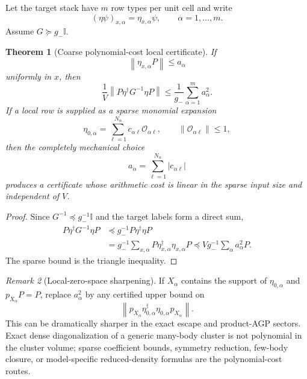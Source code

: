 \documentclass[11pt]{article}
\newtheorem{theorem}{Theorem}[section]
\theoremstyle{definition}
\theoremstyle{remark}
\newtheorem{remark}[theorem]{Remark}
\newcommand{\Id}{\mathbb I}
\newcommand{\cO}{\mathcal O}
\newcommand{\norm}[1]{\left\lVert #1\right\rVert}
\newcommand{\abs}[1]{\left\lvert #1\right\rvert}
\begin{document}
Let the target stack have $m$ row types per unit cell and write
\begin{equation}
 (\eta\psi)_{x,\alpha}=\eta_{x,\alpha}\psi,
 \qquad \alpha=1,\ldots,m.
 \label{eq:etacomponents}
\end{equation}
Assume $G\succeq g_-\Id$.

\begin{theorem}[Coarse polynomial-cost local certificate]
\label{thm:sparserow}
If
\begin{equation}
 \norm{\eta_{x,\alpha}P}\le a_\alpha
 \label{eq:arow}
\end{equation}
uniformly in $x$, then
\begin{equation}
 \boxed{
 \frac1V\norm{P\eta^\dagger G^{-1}\eta P}
 \le\frac1{g_-}\sum_{\alpha=1}^{m}a_\alpha^2.}
 \label{eq:sparserowbound}
\end{equation}
If a local row is supplied as a sparse monomial expansion
\begin{equation}
 \eta_{0,\alpha}=\sum_{\ell=1}^{N_\alpha}c_{\alpha\ell}\cO_{\alpha\ell},
 \qquad \norm{\cO_{\alpha\ell}}\le1,
 \label{eq:monomialeta}
\end{equation}
then the completely mechanical choice
\begin{equation}
 a_\alpha=\sum_{\ell=1}^{N_\alpha}\abs{c_{\alpha\ell}}
 \label{eq:l1row}
\end{equation}
produces a certificate whose arithmetic cost is linear in the sparse input size and independent of $V$.
\end{theorem}

\begin{proof}
Since $G^{-1}\preceq g_-^{-1}\Id$ and the target labels form a direct sum,
\begin{align}
 P\eta^\dagger G^{-1}\eta P
 &\preceq g_-^{-1}P\eta^\dagger\eta P\\
 &=g_-^{-1}\sum_{x,\alpha}P\eta_{x,\alpha}^\dagger\eta_{x,\alpha}P
 \preceq Vg_-^{-1}\sum_\alpha a_\alpha^2P.
\end{align}
The sparse bound is the triangle inequality.
\end{proof}

\begin{remark}[Local-zero-space sharpening]
If $X_\alpha$ contains the support of $\eta_{0,\alpha}$ and $p_{X_\alpha}P=P$, replace $a_\alpha^2$ by any certified upper bound on
\[
 \norm{p_{X_\alpha}\eta_{0,\alpha}^\dagger\eta_{0,\alpha}p_{X_\alpha}}.
\]
This can be dramatically sharper in the exact escape and product-AGP sectors.  Exact dense diagonalization of a generic many-body cluster is not polynomial in the cluster volume; sparse coefficient bounds, symmetry reduction, few-body closure, or model-specific reduced-density formulas are the polynomial-cost routes.
\end{remark}
\end{document}
